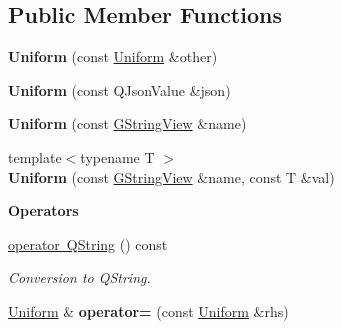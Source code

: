 \subsection*{Public Member Functions}
\begin{DoxyCompactItemize}
\item 
\mbox{\label{structrev_1_1_uniform_a0256c5c4c6b2003b914aed6d104154cf}} 
{\bfseries Uniform} (const \mbox{\hyperlink{structrev_1_1_uniform}{Uniform}} \&other)
\item 
\mbox{\label{structrev_1_1_uniform_ad61b73d2b1d1fb31b894934a9c957254}} 
{\bfseries Uniform} (const Q\+Json\+Value \&json)
\item 
\mbox{\label{structrev_1_1_uniform_af24b08ef8b73f89d3d992a19306ad637}} 
{\bfseries Uniform} (const \mbox{\hyperlink{classrev_1_1_g_string_view}{G\+String\+View}} \&name)
\item 
\mbox{\label{structrev_1_1_uniform_af43ffc8c2907c2131ef0dd3fee4c4812}} 
{\footnotesize template$<$typename T $>$ }\\{\bfseries Uniform} (const \mbox{\hyperlink{classrev_1_1_g_string_view}{G\+String\+View}} \&name, const T \&val)
\end{DoxyCompactItemize}
\begin{Indent}\textbf{ Operators}\par
\begin{DoxyCompactItemize}
\item 
\mbox{\label{structrev_1_1_uniform_a3c422cc8d638f6673587fd4949782db1}} 
\mbox{\hyperlink{structrev_1_1_uniform_a3c422cc8d638f6673587fd4949782db1}{operator Q\+String}} () const
\begin{DoxyCompactList}\small\item\em Conversion to Q\+String. \end{DoxyCompactList}\item 
\mbox{\label{structrev_1_1_uniform_a33feea609273ddb5627e5e73e6a0e970}} 
\mbox{\hyperlink{structrev_1_1_uniform}{Uniform}} \& {\bfseries operator=} (const \mbox{\hyperlink{structrev_1_1_uniform}{Uniform}} \&rhs)
\end{DoxyCompactItemize}
\end{Indent}
